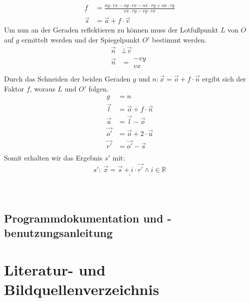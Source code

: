 \documentclass[reducespace,stylepage,semiarbeit]{spezidoc}
\begin{document}
\begin{equation*}
\begin{split}
f &= \frac{ay \cdot rx - oy \cdot rx - ax \cdot ry + ox \cdot ry}{vx \cdot ry - vy \cdot rx} \\
\vec{s} &= \vec{a} + f \cdot \vec{v}
\end{split}
\end{equation*}
Um nun an der Geraden reflektieren zu können muss der Lotfußpunkt $L$ von $O$ auf $g$ ermittelt werden und der Spiegelpunkt $O'$ bestimmt werden.
\begin{equation*}
\begin{split}
\vec{n} &\bot \vec{v} \\
\vec{n} &= \begin{matrix} -vy \\ vx \end{matrix} \\
\end{split}
\end{equation*}
Durch das Schneiden der beiden Geraden $g$ und $n: \vec{x} = \vec{o} + f \cdot \vec{n}$ ergibt sich der Faktor $f$, woraus $L$ und $O'$ folgen.
\begin{equation*}
\begin{split}
g &= n \\
\vec{l} &= \vec{o} + f \cdot \vec{n} \\
\vec{u} &= \vec{l} - \vec{o} \\
\vec{o'} &= \vec{o} + 2 \cdot \vec{u} \\
\vec{r'} &= \vec{o'} - \vec{s} \\
\end{split}
\end{equation*}
Somit erhalten wir das Ergebnis $s'$ mit:
\begin{equation*}
\underline{\underline{s':~ \vec{x} = \vec{s} + i \cdot \vec{r'} \wedge i \in \mathds{R}}}
\end{equation*}






\begin{equation*}
\begin{split}
\end{split}
\end{equation*}

\begin{subequations}
\begin{align}
\end{align}
\end{subequations}


\subsection{Programmdokumentation und -benutzungsanleitung}

\newpage
\section{Literatur- und Bildquellenverzeichnis}



\eidesstattlicheerklaerung
\end{document}
